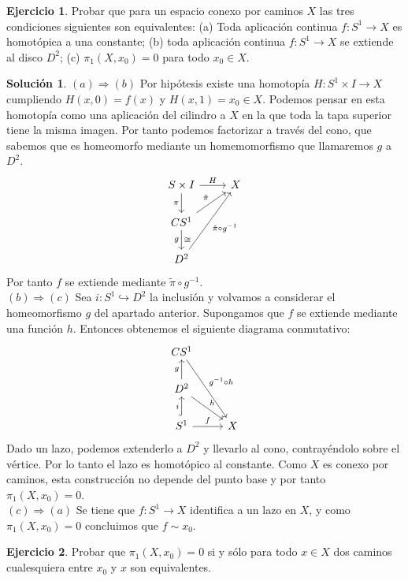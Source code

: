 \documentclass{article}
\theoremstyle{plain}
\theoremstyle{definition}
\newtheorem{exercise}{Ejercicio}
\newtheorem*{sol*}{Solución}
\begin{document}
\newpage \begin{exercise} Probar que para un espacio conexo por caminos $X$ las tres condiciones siguientes son equivalentes:
(a) Toda aplicación continua $f: S^1\to X$ es homotópica a una constante; (b) toda aplicación continua $f: S ^1 \to X$ se extiende al disco $D^2$;
(c) $\pi_1(X,x_0) = 0$ para todo $x_0\in X$.
\end{exercise}
\begin{sol*}
$\boxed{(a)\Rightarrow(b)}$ Por hipótesis existe una homotopía $H:S^1\times I\to X$ cumpliendo $H(x,0)=f(x)$ y $H(x,1)=x_0\in X$. Podemos pensar en esta homotopía como una aplicación del cilindro a $X$ en la que toda la tapa superior tiene la misma imagen. Por tanto podemos factorizar a través del cono, que sabemos que es homeomorfo mediante un homemomorfismo que llamaremos $g$ a $D^2$.
\[
\begin{tikzcd}
S\times I\arrow[r,"H"]\arrow[d,"\pi"']& X\\
CS^1\arrow[ur,"\tilde{\pi}"]\arrow[d,"g"',"\cong"]\\
D^2\arrow[uur,"\tilde{\pi}\circ g^{-1}"']
\end{tikzcd}
\]
Por tanto $f$ se extiende mediante $\tilde{\pi}\circ g^{-1}$.\\
$\boxed{(b)\Rightarrow(c)}$ Sea $i:S^1\hookrightarrow D^2$ la inclusión y volvamos a considerar el homeomorfismo $g$ del apartado anterior. Supongamos que $f$ se extiende mediante una función $h$. Entonces obtenemos el siguiente diagrama conmutativo:
\[
\begin{tikzcd}
CS^1\arrow[ddr,"g^{-1}\circ h"]\\
D^2\arrow[u,"g"]\arrow[dr,"h"]\\
S^1\arrow[u,"i",hookrightarrow]\arrow[r,"f"]& X
\end{tikzcd}
\]
Dado un lazo, podemos extenderlo a $D^2$ y llevarlo al cono, contrayéndolo sobre el vértice. Por lo tanto el lazo es homotópico al constante. Como $X$ es conexo por caminos, esta construcción no depende del punto base y por tanto $\pi_1(X,x_0)=0$.\\
$\boxed{(c)\Rightarrow(a)}$ Se tiene que $f:S^1\to X$ identifica a un lazo en $X$, y como $\pi_1(X,x_0)=0$ concluimos que $f\sim x_0$.
\end{sol*}
\newpage 

\begin{exercise}
Probar que $\pi_1(X,x_0) = 0$ si y sólo para todo $x\in X$ dos caminos cualesquiera entre $x_0$ y $x$ son equivalentes.
\end{exercise}
\end{document}
